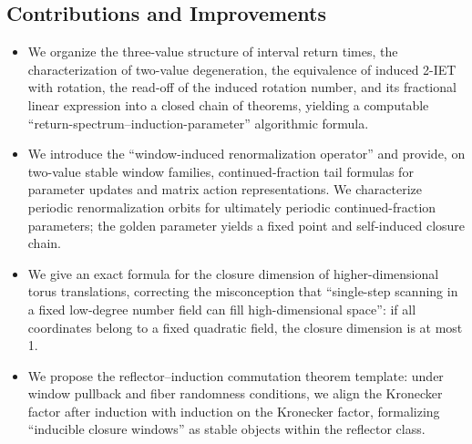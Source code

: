 \subsection{Contributions and Improvements}

\begin{itemize}
  \item We organize the three-value structure of interval return times, the characterization of two-value degeneration, the equivalence of induced 2-IET with rotation, the read-off of the induced rotation number, and its fractional linear expression into a closed chain of theorems, yielding a computable ``return-spectrum--induction-parameter'' algorithmic formula.
  \item We introduce the ``window-induced renormalization operator'' and provide, on two-value stable window families, continued-fraction tail formulas for parameter updates and matrix action representations. We characterize periodic renormalization orbits for ultimately periodic continued-fraction parameters; the golden parameter yields a fixed point and self-induced closure chain.
  \item We give an exact formula for the closure dimension of higher-dimensional torus translations, correcting the misconception that ``single-step scanning in a fixed low-degree number field can fill high-dimensional space'': if all coordinates belong to a fixed quadratic field, the closure dimension is at most 1.
  \item We propose the reflector--induction commutation theorem template: under window pullback and fiber randomness conditions, we align the Kronecker factor after induction with induction on the Kronecker factor, formalizing ``inducible closure windows'' as stable objects within the reflector class.
\end{itemize}
